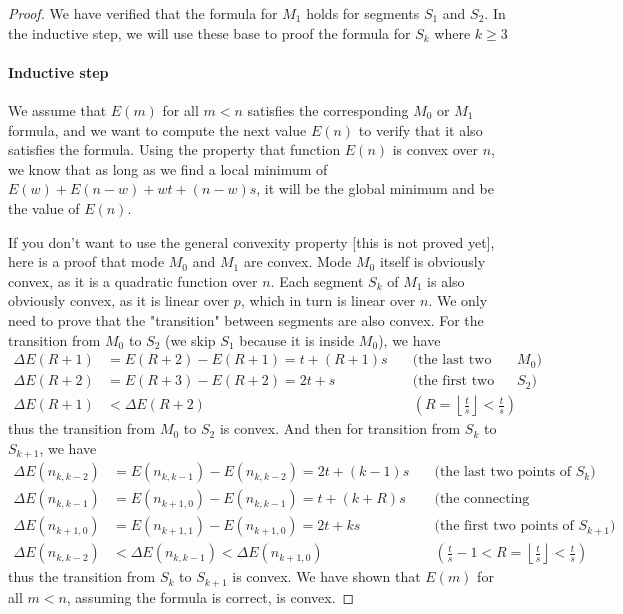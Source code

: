 \documentclass[]{article}
\begin{document}
\begin{proof}
We have verified that the formula for $M_1$ holds for segments $S_1$ and $S_2$. In the inductive step, we will use these base to proof the formula for $S_k$ where $k \geq3$

\paragraph{Inductive step}
We assume that $E(m)$ for all $m <n$ satisfies the corresponding $M_0$ or $M_1$ formula, and we want to compute the next value $E(n)$ to verify that it also satisfies the formula. Using the property that function $E(n)$ is convex over $n$, we know that as long as we find a local minimum of $E(w)+E(n-w)+wt+(n-w)s$, it will be the global minimum and be the value of $E(n)$.

If you don't want to use the general convexity property [this is not proved yet], here is a proof that mode $M_0$ and $M_1$ are convex. Mode $M_0$ itself is obviously convex, as it is a quadratic function over $n$. Each segment $S_k$ of $M_1$ is also obviously convex, as it is linear over $p$, which in turn is linear over $n$. We only need to prove that the "transition" between segments are also convex. For the transition from $M_0$ to $S_2$ (we skip $S_1$ because it is inside $M_0$), we have
\begin{align*}
\Delta E(R+1) &= E(R+2) - E(R+1) = t + (R+1)s\quad&\text{(the last two points of $M_0$)}\\
\Delta E(R+2) &= E(R+3) - E(R+2) = 2t + s\quad&\text{(the first two points of $S_2$)}\\
\Delta E(R+1) &< \Delta E(R+2) \quad&\left(R = \left\lfloor\frac{t}{s}\right\rfloor < \frac{t}{s}\right)
\end{align*}
thus the transition from $M_0$ to $S_2$ is convex. And then for transition from $S_k$ to $S_{k+1}$, we have
\begin{align*}
\Delta E(n_{k,k-2}) &= E(n_{k,k-1}) - E(n_{k,k-2}) = 2t + (k-1)s\quad&\text{(the last two points of $S_k$)}\\
\Delta E(n_{k,k-1}) &= E(n_{k+1, 0}) - E(n_{k,k-1}) = t + (k+R)s\quad&\text{(the connecting segment)}\\
\Delta E(n_{k+1,0}) &= E(n_{k+1, 1}) - E(n_{k+1,0}) = 2t + ks\quad&\text{(the first two points of $S_{k+1}$)}\\
\Delta E(n_{k,k-2}) &<  \Delta E(n_{k,k-1}) < \Delta E(n_{k+1,0}) \quad&\left(\frac{t}{s} -1 < R = \left\lfloor\frac{t}{s}\right\rfloor < \frac{t}{s}\right)
\end{align*}
thus the transition from $S_k$ to $S_{k+1}$ is convex. We have shown that $E(m)$ for all $m<n$, assuming the formula is correct, is convex.


\end{proof}
\end{document}
